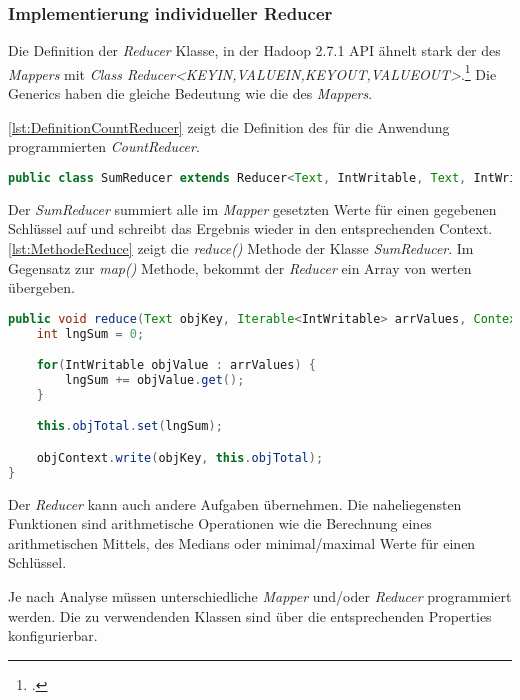\subsubsection{Implementierung individueller Reducer}
Die Definition der \textit{Reducer} Klasse, in der Hadoop 2.7.1 \ac{API} ähnelt stark der des \textit{Mappers} mit \textit{Class Reducer<KEYIN,VALUEIN,KEYOUT,VALUEOUT>}.\footcite[Vgl.][]{ApacheHadoopApiDokuReducer.2015} Die Generics haben die gleiche Bedeutung wie die des \textit{Mappers}.

\autoref{lst:DefinitionCountReducer} zeigt die Definition des für die Anwendung programmierten \textit{CountReducer}.  \\

\begin{lstlisting}[language=Java,caption=Deklaration \textit{CountReducer} mit Generics,label=lst:DefinitionCountReducer]
public class SumReducer extends Reducer<Text, IntWritable, Text, IntWritable>
\end{lstlisting}

Der \textit{SumReducer} summiert alle im \textit{Mapper} gesetzten Werte für einen gegebenen Schlüssel auf und schreibt das Ergebnis wieder in den entsprechenden Context. \autoref{lst:MethodeReduce} zeigt die \textit{reduce()} Methode der Klasse \textit{SumReducer}. Im Gegensatz zur \textit{map()} Methode, bekommt der \textit{Reducer} ein Array von werten übergeben. \\

\begin{lstlisting}[language=Java,caption=Methode \textit{reduce()} der Klasse \textit{SumReducer},label=lst:MethodeReduce]
public void reduce(Text objKey, Iterable<IntWritable> arrValues, Context objContext) throws IOException, InterruptedException {
	int lngSum = 0;

	for(IntWritable objValue : arrValues) {
		lngSum += objValue.get();
	}

	this.objTotal.set(lngSum);

	objContext.write(objKey, this.objTotal);
}
\end{lstlisting}

Der \textit{Reducer} kann auch andere Aufgaben übernehmen. Die naheliegensten Funktionen sind arithmetische Operationen wie die Berechnung eines arithmetischen Mittels, des Medians oder minimal/maximal Werte für einen Schlüssel.

Je nach Analyse müssen unterschiedliche \textit{Mapper} und/oder \textit{Reducer} programmiert werden. Die zu verwendenden Klassen sind über die entsprechenden Properties konfigurierbar.

